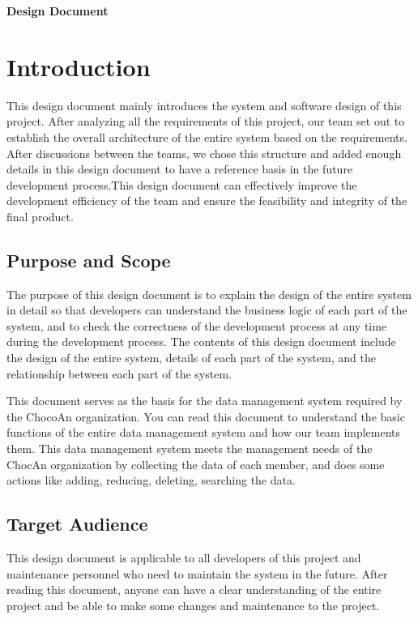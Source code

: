 \documentclass{article}
\renewcommand{\maketitle}{
   \begin{center}
      {\Huge \bfseries Design Document}
   \end{center}
}
\begin{document}
\maketitle
\tableofcontents

\section{Introduction}
This design document mainly introduces the system and software design of this project. After analyzing all the requirements of this project, our team set out to establish the overall architecture of the entire system based on the requirements. After discussions between the teams, we chose this structure and added enough details in this design document  to have a reference basis in the future development process.This design document can effectively improve the development efficiency of the team and ensure the feasibility and integrity of the final product.

\subsection{Purpose and Scope}
The purpose of this design document is to explain the design of the entire system in detail so that developers can understand the business logic of each part of the system, and to check the correctness of the development process at any time during the development process. The contents of this design document include the design of the entire system, details of each part of the system, and the relationship between each part of the system.

This document serves as the basis for the data management system required by the ChocoAn organization. You can read this document to understand the basic functions of the entire data management system and how our team implements them. This data management system meets the management needs of the ChocAn organization by collecting the data of each member, and does some actions like  adding, reducing, deleting, searching the data.

\subsection{Target Audience}
This design document is applicable to all developers of this project and maintenance personnel who need to maintain the system in the future. After reading this document, anyone can have a clear understanding of the entire project and be able to make some changes and maintenance to the project.
\end{document}
